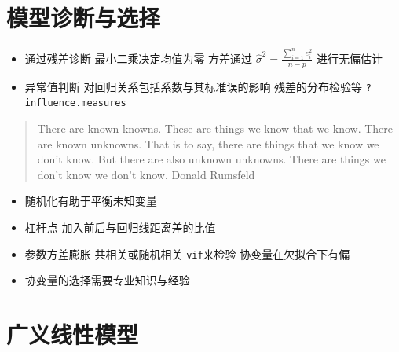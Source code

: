 \documentclass[]{book}
\providecommand{\tightlist}{%
  \setlength{\itemsep}{0pt}\setlength{\parskip}{0pt}}
\begin{document}
\section{模型诊断与选择}

\begin{itemize}
\tightlist
\item
  通过残差诊断 最小二乘决定均值为零 方差通过 \(\hat \sigma^2 = \frac{\sum_{i=1}^n e_i^2}{n-p}\) 进行无偏估计
\item
  异常值判断 对回归关系包括系数与其标准误的影响 残差的分布检验等 \texttt{?influence.measures}
\end{itemize}

\begin{quote}
There are known knowns. These are things we know that we know. There are known unknowns. That is to say, there are things that we know we don't know. But there are also unknown unknowns. There are things we don't know we don't know. Donald Rumsfeld
\end{quote}

\begin{itemize}
\tightlist
\item
  随机化有助于平衡未知变量
\item
  杠杆点 加入前后与回归线距离差的比值
\item
  参数方差膨胀 共相关或随机相关 \texttt{vif}来检验 协变量在欠拟合下有偏
\item
  协变量的选择需要专业知识与经验
\end{itemize}

\section{广义线性模型}
\end{document}
